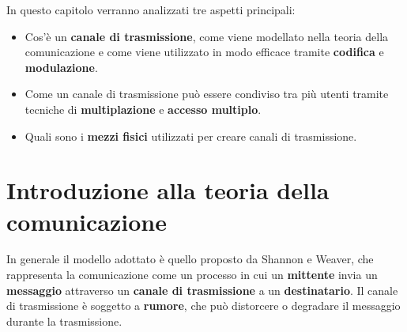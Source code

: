 In questo capitolo verranno analizzati tre aspetti principali:
\begin{itemize}
	\item Cos'è un \textbf{canale di trasmissione}, come viene modellato nella teoria della comunicazione e come viene utilizzato in modo efficace tramite \textbf{codifica} e \textbf{modulazione}.
	\item Come un canale di trasmissione può essere condiviso tra più utenti tramite tecniche di \textbf{multiplazione} e \textbf{accesso multiplo}.
	\item Quali sono i \textbf{mezzi fisici} utilizzati per creare canali di trasmissione.
\end{itemize}
\section{Introduzione alla teoria della comunicazione}
In generale il modello adottato è quello proposto da Shannon e Weaver, 
che rappresenta la comunicazione come un processo in cui un \textbf{mittente} invia un \textbf{messaggio} attraverso un \textbf{canale di trasmissione} a un \textbf{destinatario}.
Il canale di trasmissione è soggetto a \textbf{rumore}, che può distorcere o degradare il messaggio durante la trasmissione. 

